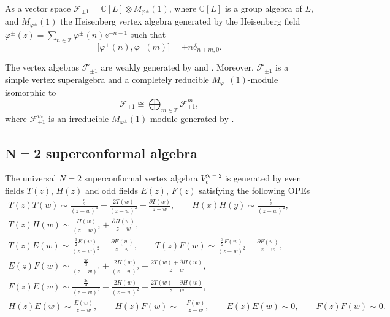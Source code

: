 \documentclass[pdftex]{sigma}
\numberwithin{equation}{section}
\newcommand{\Z}{\mathbb Z}
\newcommand{\C}{\mathbb C}
\newcommand{\F}{\mathcal F}
\begin{document}
As a vector space $\F_{\pm 1} = {\C}[L] \otimes M_{\varphi^{\pm}} (1)$, where ${\C}[L]$ is a group algebra of $L$, and $M_{\varphi^{\pm}} (1)$ the Heisenberg vertex algebra generated by the Heisenberg field $\varphi^{\pm}(z) = \sum_{n \in {\Z} } \varphi^{\pm}(n) z^{-n-1}$ such that
\[
 \bigl[\varphi^{\pm}(n), \varphi^{\pm}(m)\bigr] = \pm n \delta_{n+m, 0}.
 \]

The vertex algebras $\F_{\pm 1}$ are weakly generated by  and .
Moreover, $\F_{\pm 1}$ is a simple vertex superalgebra and a completely reducible $M_{\varphi^{\pm}} (1)$-module isomorphic to
\[
\F_{\pm 1} \cong \bigoplus_{m \in \mathbb{Z}} \F_{\pm 1}^m ,
\]
where $ \F_{\pm 1}^m$ is an irreducible $M_{\varphi^{\pm}} (1)$-module generated by .


\subsection[N=2 superconformal algebra]{$\boldsymbol{ N=2}$ superconformal algebra}

The universal $N=2$ superconformal vertex algebra $V^{N=2}_{c}$ is generated by even fields $T(z)$, $H(z)$ and odd fields $E(z)$, $F(z)$
satisfying the following OPEs
\begin{gather*}
 T(z)T(w) \sim \frac{\frac{c}{2}}{(z-w)^{4}}+\frac{2T(w)}{(z-w)^{2}} + \frac{\partial T(w)}{z-w}, \qquad H(x)H(y) \sim \frac{ \frac{c}{3}}{(z-w)^{2}}, \qquad \\
 T(z)H(w) \sim \frac{H(w)}{ (z-w)^{2}}+ \frac{\partial H(w)}{z-w}, \\
 T(z)E(w) \sim \frac{\frac{3}{2} E(w)}{(z-w)^{2}} + \frac{\partial E(w)}{z-w}, \qquad T(z)F(w) \sim \frac{\frac{3}{2} F(w)}{(z-w)^{2}} + \frac{\partial F(w)}{z-w}, \\
	E(z)F(w) \sim \frac{\frac{2c}{3}}{(z-w)^{3}}+\frac{2H(w)}{(z-w)^{2}} + \frac{2T(w) + \partial H(w)}{z-w}, \\
	F(z)E(w) \sim \frac{\frac{2c}{3}}{(z-w)^{3}}-\frac{2H(w)}{(z-w)^{2}} + \frac{2T(w) - \partial H(w)}{z-w}, \\
	H(z)E(w) \sim \frac{E(w)}{z-w}, \qquad H(z)F(w) \sim -\frac{F(w)}{z-w}, \qquad E(z)E(w) \sim 0, \qquad F(z)F(w) \sim 0. 	
\end{gather*}
\end{document}

